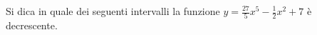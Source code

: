 Si dica in quale dei seguenti intervalli la funzione $y=\frac{27} 5x^5-\frac 1 2x^2+7$ è decrescente.

